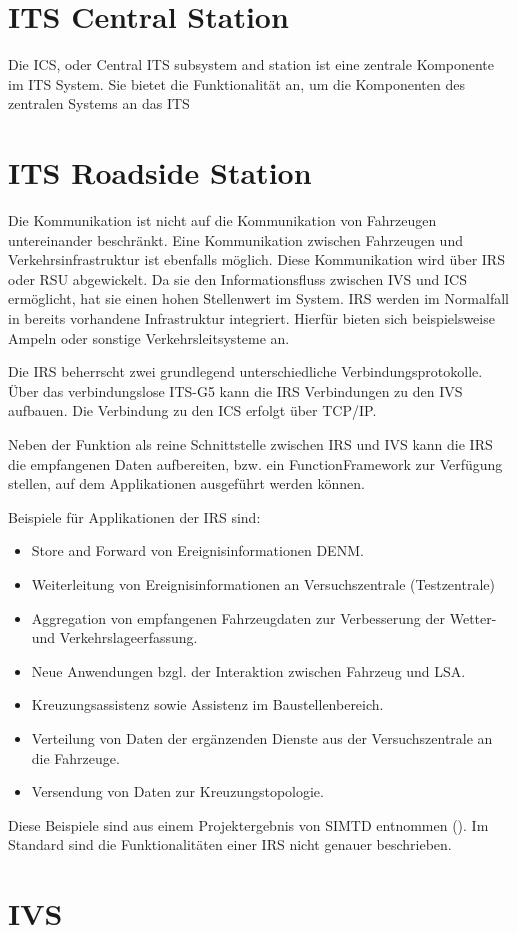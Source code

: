 \section{ITS Central Station}
Die \ac{ICS}, oder Central \ac{ITS} subsystem and station ist eine zentrale Komponente im \ac{ITS} System. Sie bietet die Funktionalität an, um die Komponenten des zentralen Systems an das \ac{ITS} 

\section{ITS Roadside Station}
Die Kommunikation ist nicht auf die Kommunikation von Fahrzeugen untereinander beschränkt. Eine Kommunikation zwischen Fahrzeugen und Verkehrsinfrastruktur ist ebenfalls möglich. Diese Kommunikation wird über \ac{IRS} oder \ac{RSU} abgewickelt. Da sie den Informationsfluss zwischen \ac{IVS} und \ac{ICS} ermöglicht, hat sie einen hohen Stellenwert im System. \ac{IRS} werden im Normalfall in bereits vorhandene Infrastruktur integriert. Hierfür bieten sich beispielsweise Ampeln oder sonstige Verkehrsleitsysteme an. 

Die \ac{IRS} beherrscht zwei grundlegend unterschiedliche Verbindungsprotokolle. Über das verbindungslose ITS-G5 kann die \ac{IRS} Verbindungen zu den \ac{IVS} aufbauen. Die Verbindung zu den \ac{ICS} erfolgt über TCP/IP. 

Neben der Funktion als reine Schnittstelle zwischen \ac{IRS} und \ac{IVS} kann die \ac{IRS} die empfangenen Daten aufbereiten, bzw. ein FunctionFramework zur Verfügung stellen, auf dem Applikationen ausgeführt werden können.


Beispiele für Applikationen der \ac{IRS} sind:
\begin{itemize}
	\item Store and Forward von Ereignisinformationen \ac{DENM}.
	\item Weiterleitung von Ereignisinformationen an Versuchszentrale (Testzentrale)
	\item Aggregation von empfangenen Fahrzeugdaten zur Verbesserung der Wetter- und Verkehrslageerfassung. 
	\item Neue Anwendungen bzgl. der Interaktion zwischen Fahrzeug und LSA.
	\item  Kreuzungsassistenz sowie Assistenz im Baustellenbereich.
	\item Verteilung von Daten der ergänzenden Dienste aus der Versuchszentrale an die Fahrzeuge.
	\item Versendung von Daten zur Kreuzungstopologie.
\end{itemize}

Diese Beispiele sind aus einem Projektergebnis von \ac{SIMTD} entnommen (\cite{simtd-D12.1}). Im Standard sind die Funktionalitäten einer \ac{IRS} nicht genauer beschrieben. 




\section{IVS}


